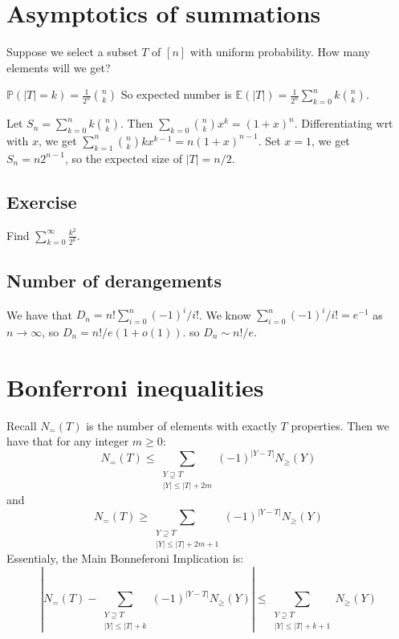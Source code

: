 \documentclass[]{article}
\theoremstyle{definition}
\numberwithin{theorem}{section}
\numberwithin{equation}{section}
\begin{document}
\section{Asymptotics of summations}

Suppose we select a subset $T$ of $[n]$ with uniform probability. How many elements will we get?

$\mathbb{P}(|T| = k) = \frac{1}{2^n} \binom{n}{k}$ So expected number is $\mathbb{E}(|T|) = \frac{1}{2^n} \sum_{k = 0}^{n} k \binom{n}{k}$.

Let $S_n = \sum_{k = 0}^{n} k \binom{n}{k}$. Then $\sum_{k = 0} \binom{n}{k} x^k = (1 + x)^n$. Differentiating wrt with $x$, we get $\sum_{k = 1}^{n} \binom{n}{k} k x^{k - 1} = n (1 + x)^{n - 1}$. Set $x = 1$, we get $S_n = n 2^{n - 1}$, so the expected size of $|T| = n/2$. 

\subsection{Exercise}
Find
$\sum_{k = 0}^{\infty} \frac{k^2}{2^k}$.
\subsection{Number of derangements}
We have that $D_n = n! \sum_{i = 0}^{n} (-1)^i/i!$. We know $\sum_{i = 0}^{n} (-1)^i/i! = e^{-1}$ as $n \rightarrow \infty$, so $D_n = n!/e(1 + o(1))$. so $D_n \sim n!/e$. 


\section{Bonferroni inequalities}
Recall $N_=(T)$ is the number of elements with exactly $T$ properties. Then we have that for any integer $m \geq 0$:
\begin{equation}
	N_=(T) \leq \sum_{\substack{Y \supseteq T \\ |Y| \leq |T| + 2m}} (-1)^{|Y - T|}N_{\geq }(Y)
\end{equation}
and 
\begin{equation}
	N_=(T) \geq \sum_{\substack{Y \supseteq T \\ |Y| \leq |T| + 2m + 1}} (-1)^{|Y - T|}N_{\geq }(Y)
\end{equation}
Essentialy, the Main Bonneferoni Implication is:
\begin{equation}
	\left| N_=(T) - \sum_{\substack{Y \supseteq T \\ |Y| \leq |T| + k}} (-1)^{|Y - T|}N_{\geq }(Y) \right|  \leq  \sum_{\substack{Y \supseteq T \\ |Y| \leq |T| + k + 1}}N_{\geq }(Y)
\end{equation}
\end{document}
